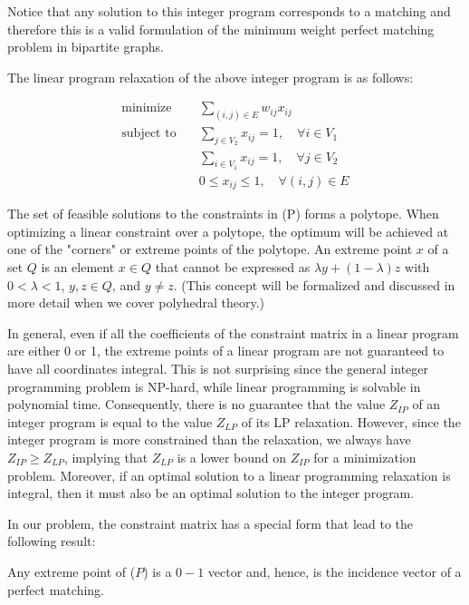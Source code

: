 Notice that any solution to this integer program corresponds to a matching and therefore this is a valid formulation of the minimum weight perfect matching problem in bipartite graphs.

The linear program relaxation of the above integer program is as follows:

\begin{equation}
    \begin{aligned}
        \text{minimize} \quad & \sum_{(i, j) \in E} w_{ij} x_{ij} \\
        \text{subject to} \quad & \sum_{j \in V_2} x_{ij} = 1, \quad \forall i \in V_1 \\
        & \sum_{i \in V_1} x_{ij} = 1, \quad \forall j \in V_2 \\
        & 0 \leq x_{ij} \leq 1, \quad \forall (i, j) \in E
    \end{aligned}
\end{equation}

The set of feasible solutions to the constraints in (P) forms a polytope. When optimizing a linear constraint over a polytope, the optimum will be achieved at one of the "corners" or extreme points of the polytope. An extreme point $x$ of a set $Q$ is an element $x \in Q$ that cannot be expressed as $\lambda y + (1 - \lambda) z$ with $0 < \lambda < 1$, $y, z \in Q$, and $y \neq z$. (This concept will be formalized and discussed in more detail when we cover polyhedral theory.)

In general, even if all the coefficients of the constraint matrix in a linear program are either 0 or 1, the extreme points of a linear program are not guaranteed to have all coordinates integral. This is not surprising since the general integer programming problem is NP-hard, while linear programming is solvable in polynomial time. Consequently, there is no guarantee that the value $Z_{IP}$ of an integer program is equal to the value $Z_{LP}$ of its LP relaxation. However, since the integer program is more constrained than the relaxation, we always have $Z_{IP} \geq Z_{LP}$, implying that $Z_{LP}$ is a lower bound on $Z_{IP}$ for a minimization problem. Moreover, if an optimal solution to a linear programming relaxation is integral, then it must also be an optimal solution to the integer program.

In our problem, the constraint matrix has a special form that lead to the following result: 

\begin{theorem}
    Any extreme point of ($P$) is a $0-1$ vector and, hence, is the incidence vector of a perfect matching.
\end{theorem}


